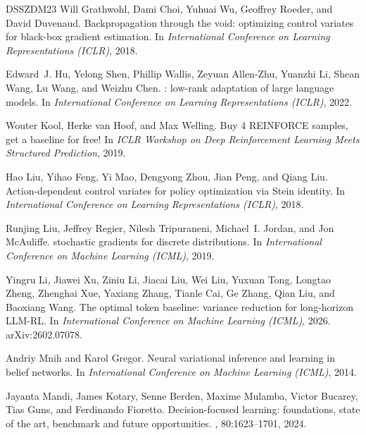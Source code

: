 \documentclass[10pt]{article}
\theoremstyle{plain}
\theoremstyle{definition}
\theoremstyle{remark}
\theoremstyle{definition}
\begin{document}
\begin{thebibliography}{DSSZDM23}
Will Grathwohl, Dami Choi, Yuhuai Wu, Geoffrey Roeder, and David Duvenaud.
\newblock Backpropagation through the void: optimizing control variates for black-box gradient estimation.
\newblock In {\em International Conference on Learning Representations (ICLR)}, 2018.

Edward~J. Hu, Yelong Shen, Phillip Wallis, Zeyuan Allen-Zhu, Yuanzhi Li, Shean Wang, Lu Wang, and Weizhu Chen.
: low-rank adaptation of large language models.
\newblock In {\em International Conference on Learning Representations (ICLR)}, 2022.

Wouter Kool, Herke van Hoof, and Max Welling.
\newblock Buy 4 {REINFORCE} samples, get a baseline for free!
\newblock In {\em ICLR Workshop on Deep Reinforcement Learning Meets Structured Prediction}, 2019.

Hao Liu, Yihao Feng, Yi Mao, Dengyong Zhou, Jian Peng, and Qiang Liu.
\newblock Action-dependent control variates for policy optimization via {Stein} identity.
\newblock In {\em International Conference on Learning Representations (ICLR)}, 2018.

Runjing Liu, Jeffrey Regier, Nilesh Tripuraneni, Michael~I. Jordan, and Jon McAuliffe.
 stochastic gradients for discrete distributions.
\newblock In {\em International Conference on Machine Learning (ICML)}, 2019.

Yingru Li, Jiawei Xu, Ziniu Li, Jiacai Liu, Wei Liu, Yuxuan Tong, Longtao Zheng, Zhenghai Xue, Yaxiang Zhang, Tianle Cai, Ge Zhang, Qian Liu, and Baoxiang Wang.
\newblock The optimal token baseline: variance reduction for long-horizon {LLM-RL}.
\newblock In {\em International Conference on Machine Learning (ICML)}, 2026.
\newblock arXiv:2602.07078.

Andriy Mnih and Karol Gregor.
\newblock Neural variational inference and learning in belief networks.
\newblock In {\em International Conference on Machine Learning (ICML)}, 2014.

Jayanta Mandi, James Kotary, Senne Berden, Maxime Mulamba, Victor Bucarey, Tias Guns, and Ferdinando Fioretto.
\newblock Decision-focused learning: foundations, state of the art, benchmark and future opportunities.
, 80:1623--1701, 2024.


\end{thebibliography}
\end{document}
